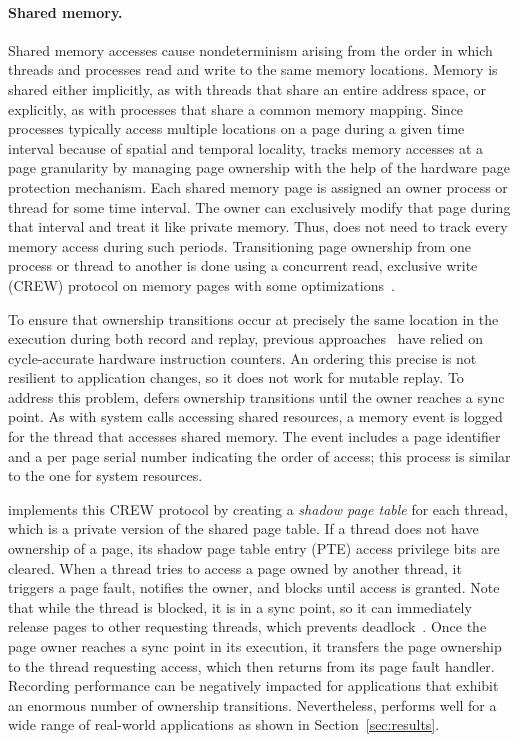 \paragraph{Shared memory.}
Shared memory accesses cause nondeterminism arising from the order in
which threads and processes read and write to the same memory locations.
Memory is shared either implicitly, as with threads that share an
entire address space, or explicitly, as with processes that share a common
memory mapping.  Since processes typically access multiple locations
on a page during a given time interval because of spatial and temporal
locality, {\dora} tracks memory accesses at a page granularity
by managing page ownership with the help of the hardware page protection mechanism.
Each shared memory page is assigned an owner process or thread for
some time interval. The owner can exclusively modify that page during
that interval and treat it like private memory. Thus, {\dora} does not need
to track every memory access during such
periods. Transitioning page ownership from one process or thread to
another is done using a concurrent read, exclusive write (CREW)
protocol on memory pages with some optimizations~\cite{scribe:sigmetrics10}.

To ensure that ownership transitions occur at precisely the same
location in the execution during both record and replay, previous
approaches~\cite{bressoud-tft, bressoud, revirt, smp-revirt:vee08}
have relied on cycle-accurate hardware instruction counters.  An ordering
this precise is not resilient to application changes, so it does not work for
mutable replay. To address this problem, {\dora} defers ownership
transitions until the owner reaches a sync point.  As with system
calls accessing shared resources, a memory event is logged for the
thread that accesses shared memory. The event includes a page
identifier and a per page serial number indicating the order of access; this
process is similar to the one for system resources.

{\dora} implements this CREW protocol by creating a
\emph{shadow page table} for each thread, which is a private version
of the shared page table.   If a thread does not have ownership of a
page, its shadow page table entry (PTE) access privilege bits are
cleared.  When a thread tries to access a page owned by another
thread, it triggers a page fault, notifies the owner, and blocks
until access is granted.  Note that while the thread is blocked, it
is in a sync point, so it can immediately release pages to other
requesting threads, which prevents
deadlock~\cite{scribe:sigmetrics10}.  Once the page owner reaches a
sync point in its execution, it transfers the page ownership to the
thread requesting access, which then returns from its page fault
handler.
Recording performance can be negatively impacted for applications that
exhibit an enormous number of ownership transitions.  Nevertheless,
{\dora} performs well for a wide range of 
real-world applications as shown in Section~\ref{sec:results}.

